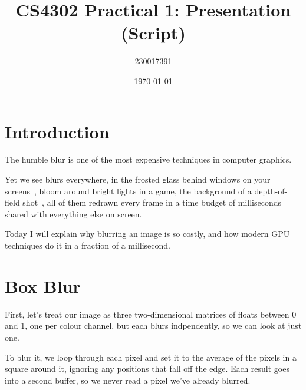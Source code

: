 \documentclass{article}
\title{CS4302 Practical 1: Presentation (Script)}
\author{230017391}
\date{\today}
\begin{document}
\maketitle


\section{Introduction}

The humble blur is one of the most expensive techniques in computer graphics.

Yet we see blurs everywhere, in the frosted glass behind windows on your screens~\cite{android:window-blurs,kde:kwin-blur-source}, bloom around bright lights in a game, the background of a depth-of-field shot~\cite{kawase:gdc2003}, all of them redrawn every frame in a time budget of milliseconds shared with everything else on screen.

Today I will explain why blurring an image is so costly, and how modern GPU techniques do it in a fraction of a millisecond.


\section{Box Blur}

First, let's treat our image as three two-dimensional matrices of floats between 0 and 1, one per colour channel, but each blurs indpendently, so we can look at just one.

To blur it, we loop through each pixel and set it to the average of the pixels in a square around it, ignoring any positions that fall off the edge. Each result goes into a second buffer, so we never read a pixel we've already blurred.
\end{document}
